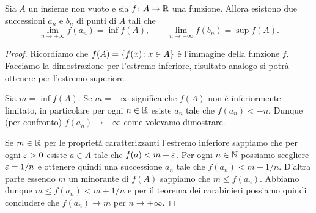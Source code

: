 \begin{lemma}
Sia $A$ un insieme non vuoto e
sia $f\colon A \to \mathbb R$ una funzione. Allora esistono
due successioni $a_n$ e $b_n$ di punti di $A$ tali che
\[
  \lim_{n\to +\infty} f(a_n) = \inf f(A), \qquad
  \lim_{n\to +\infty} f(b_n) = \sup f(A).
\]
\end{lemma}
%
\begin{proof}
Ricordiamo che $f(A) = {\left\{ f(x)\colon x \in A \right\}}$ è l'immagine
della funzione $f$. Facciamo la dimostrazione per l'estremo inferiore,
risultato analogo si potrà ottenere per l'estremo superiore.

Sia $m=\inf f(A)$.
Se $m=-\infty$ significa che $f(A)$ non è inferiormente limitato,
in particolare per ogni $n\in \mathbb R$ esiste $a_n$ tale che
$f(a_n) < - n$.
Dunque (per confronto) $f(a_n) \to -\infty$
come volevamo dimostrare.

Se $m\in \mathbb R$ per le proprietà caratterizzanti l'estremo inferiore
sappiamo che per ogni $\varepsilon>0$ esiste $a\in A$ tale che
$f(a) < m + \varepsilon$.
Per ogni $n\in\mathbb N$ possiamo scegliere $\varepsilon=1/n$ e ottenere quindi
una successione $a_n$ tale che $f(a_n) < m + 1/n$.
D'altra parte essendo $m$ un minorante di $f(A)$ sappiamo che
$m \le f(a_n)$.
Abbiamo dunque $m \le f(a_n) < m+ 1/n$ e per il teorema dei
carabinieri possiamo quindi concludere che $f(a_n) \to m$
per $n\to +\infty$.
\end{proof}

